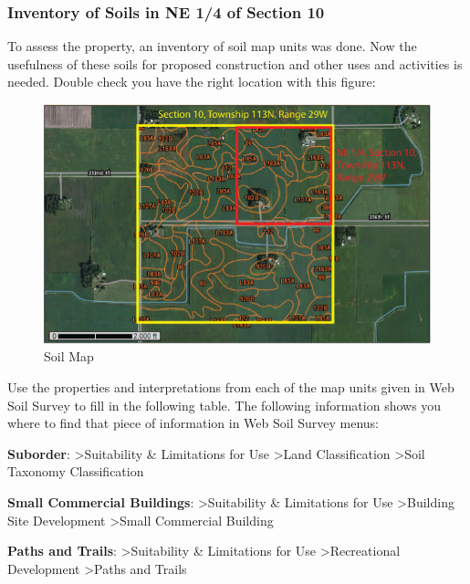 \documentclass[
  letterpaper,
  twocolumn,
  portrait]{scrbook}
\begin{document}
\hypertarget{inventory-of-soils-in-ne-14-of-section-10}{%
\subsubsection{Inventory of Soils in NE 1/4 of Section
10}\label{inventory-of-soils-in-ne-14-of-section-10}}

To assess the property, an inventory of soil map units was done. Now the
usefulness of these soils for proposed construction and other uses and
activities is needed. Double check you have the right location with this
figure:

\begin{figure}

{\centering \includegraphics{inventory-of-soil.png}

}

\caption{\label{fig-inventory}Soil Map}

\end{figure}

Use the properties and interpretations from each of the map units given
in Web Soil Survey to fill in the following table. The following
information shows you where to find that piece of information in Web
Soil Survey menus:

\textbf{Suborder}: \textgreater Suitability \& Limitations for Use
\textgreater Land Classification \textgreater Soil Taxonomy
Classification

\textbf{Small Commercial Buildings}: \textgreater Suitability \&
Limitations for Use \textgreater Building Site Development
\textgreater Small Commercial Building

\textbf{Paths and Trails}: \textgreater Suitability \& Limitations for
Use \textgreater Recreational Development \textgreater Paths and Trails
\end{document}
